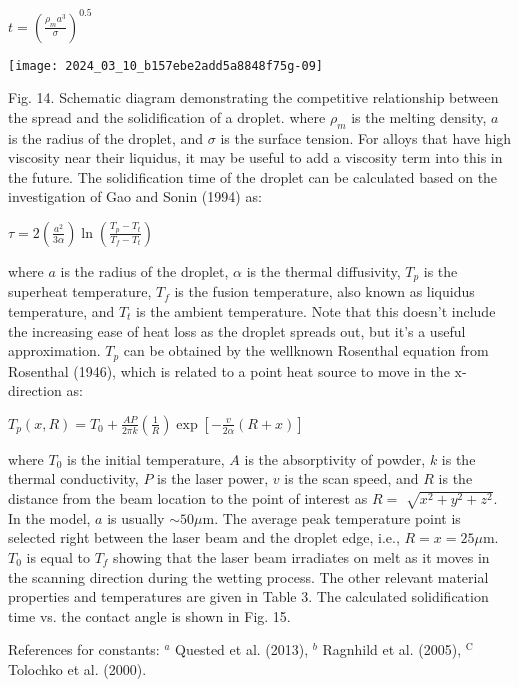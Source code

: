 \documentclass[10pt]{article}
\begin{document}
$t=\left(\frac{\rho_{m} a^{3}}{\sigma}\right)^{0.5}$

\begin{center}
\texttt{[image: 2024\_03\_10\_b157ebe2add5a8848f75g-09]}
\end{center}

Fig. 14. Schematic diagram demonstrating the competitive relationship between the spread and the solidification of a droplet. where $\rho_{m}$ is the melting density, $a$ is the radius of the droplet, and $\sigma$ is the surface tension. For alloys that have high viscosity near their liquidus, it may be useful to add a viscosity term into this in the future. The solidification time of the droplet can be calculated based on the investigation of Gao and Sonin (1994) as:

$\tau=2\left(\frac{a^{2}}{3 \alpha}\right) \ln \left(\frac{T_{p}-T_{t}}{T_{f}-T_{t}}\right)$

where $a$ is the radius of the droplet, $\alpha$ is the thermal diffusivity, $T_{p}$ is the superheat temperature, $T_{f}$ is the fusion temperature, also known as liquidus temperature, and $T_{t}$ is the ambient temperature. Note that this doesn't include the increasing ease of heat loss as the droplet spreads out, but it's a useful approximation. $T_{p}$ can be obtained by the wellknown Rosenthal equation from Rosenthal (1946), which is related to a point heat source to move in the $\mathrm{x}$-direction as:

$T_{p}(x, R)=T_{0}+\frac{A P}{2 \pi k}\left(\frac{1}{R}\right) \exp \left[-\frac{v}{2 \alpha}(R+x)\right]$

where $T_{0}$ is the initial temperature, $A$ is the absorptivity of powder, $k$ is the thermal conductivity, $P$ is the laser power, $v$ is the scan speed, and $R$ is the distance from the beam location to the point of interest as $R=$ $\sqrt{x^{2}+y^{2}+z^{2}}$. In the model, $a$ is usually $\sim 50 \mu \mathrm{m}$. The average peak temperature point is selected right between the laser beam and the droplet edge, i.e., $R=x=25 \mu \mathrm{m}$. $T_{0}$ is equal to $T_{f}$ showing that the laser beam irradiates on melt as it moves in the scanning direction during the wetting process. The other relevant material properties and temperatures are given in Table 3. The calculated solidification time vs. the contact angle is shown in Fig. 15.

References for constants: ${ }^{a}$ Quested et al. (2013), ${ }^{b}$ Ragnhild et al. (2005), ${ }^{\text {C}}$ Tolochko et al. (2000).
\end{document}
